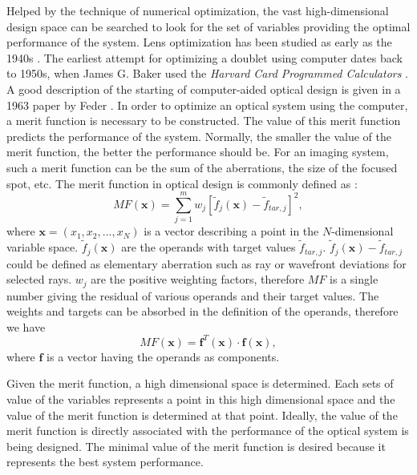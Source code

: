 Helped by the technique of numerical optimization, the vast high-dimensional design space can be searched to look for the set of variables providing the optimal performance of the system. Lens optimization has been studied as early as the 1940s \cite{wikilensdesign}. The earliest attempt for optimizing a doublet using computer dates back to 1950s, when James G. Baker used the \textit{Harvard Card Programmed Calculators} \cite{ThompsonOpticalDesignHistory}.  A good description of the starting of computer-aided optical design is given in a 1963 paper by Feder \cite{Feder:63}. In order to optimize an optical system using the computer, a merit function is necessary to be constructed. The value of this merit function predicts the performance of the system. Normally, the smaller the value of the merit function, the better the performance should be. For an imaging system, such a merit function can be the sum of the aberrations, the size of the focused spot, etc.  The merit function in optical design is commonly defined as \cite{GrossHBOvol3}:
\setlength{\belowdisplayshortskip}{5pt}
\setlength{\abovedisplayshortskip}{5pt}
\begin{equation} \label{eq:MFdefi}
MF(\pmb{x})=\sum_{j=1}^{m} w_j [\tilde{f}_j(\pmb{x}) - \tilde{f}_{tar,j} ]^2,
\end{equation}
\noindent where $\textbf{x} = (x_1, x_2, ..., x_N)$ is a vector describing a point in the $N$-dimensional variable space. $\tilde{f}_j(\textbf{x})$ are the operands with target values $\tilde{f}_{tar,j}$. $\tilde{f}_j(\textbf{x}) - \tilde{f}_{tar,j}$ could be defined as elementary aberration such as ray or wavefront deviations for selected rays. $w_j$ are the positive weighting factors, therefore $MF$ is a single number giving the residual of various operands and their target values. The weights and targets can be absorbed in the definition of the operands, therefore we have 
\begin{equation} \label{mf_oprand_vector}
MF(\pmb{x}) = \pmb{f}^{T}(\pmb{x})\cdot \pmb{f}(\pmb{x}),
\end{equation} where $\pmb{f}$ is a vector having the operands as components.

Given the merit function, a high dimensional space is determined. Each sets of value of the variables represents a point in this high dimensional space and the value of the merit function is determined at that point. Ideally, the value of the merit function is directly associated with the performance of the optical system is being designed. The minimal value of the merit function is desired because it represents the best system performance. 

